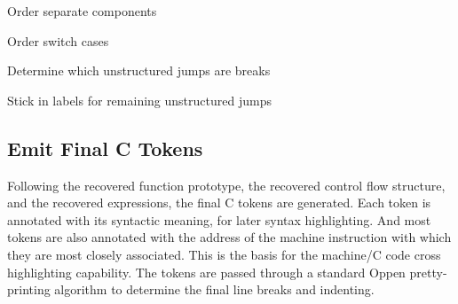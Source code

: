 \begin{DoxyEnumerate}
\item Order separate components
\item Order switch cases
\item Determine which unstructured jumps are breaks
\item Stick in labels for remaining unstructured jumps
\end{DoxyEnumerate}\hypertarget{index_step14}{}\subsection{Emit Final C Tokens}\label{index_step14}
Following the recovered function prototype, the recovered control flow structure, and the recovered expressions, the final C tokens are generated. Each token is annotated with its syntactic meaning, for later syntax highlighting. And most tokens are also annotated with the address of the machine instruction with which they are most closely associated. This is the basis for the machine/C code cross highlighting capability. The tokens are passed through a standard Oppen pretty-\/printing algorithm to determine the final line breaks and indenting. 